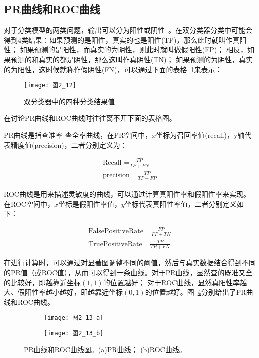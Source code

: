 \subsection{PR曲线和ROC曲线}
\label{2_5_1}

对于分类模型的两类问题，输出可以分为阳性或阴性~\cite{Powers2007Evaluation}。在双分类器分类中可能会得到$4$类结果：如果预测的是阳性，真实的也是阳性(TP)，那么此时就叫作真阳性； 如果预测的是阳性，而真实的为阴性，则此时就叫做假阳性(FP)； 相反，如果预测的和真实的都是阴性，那么这叫作真阴性(TN)； 如果预测的为阴性，真实的为阳性，这时候就称作假阴性(FN)，可以通过下面的表格~\ref{图2_12}来表示：
\begin{figure}[h] %
  \centering
  \texttt{[image: 图2\_12]}
  \caption{双分类器中的四种分类结果值}
  \label{图2_12}
\end{figure}
在讨论PR曲线和ROC曲线时往往离不开下面的表格图。

PR曲线是指查准率-查全率曲线，在PR空间中，$x$坐标为召回率值(recall)，y轴代表精度值(precision)，二者分别定义为：
\begin{linenomath}
\begin{align}
\textrm{Recall =$\frac{TP}{TP+FN}$}\label{式2_38}\\
\textrm{precision =$\frac{TP}{TP+FP}$}\label{式2_39}
\end{align}
\end{linenomath}

ROC曲线是用来描述灵敏度的曲线，可以通过计算真阳性率和假阳性率来实现。在ROC空间中，$x$坐标是假阳性率值，$y$坐标代表真阳性率值，二者分别定义如下：
\begin{linenomath}
\begin{align}
\textrm{FalsePositiveRate =$\frac{FP}{FP+TN}$}\label{式2_40}\\
\textrm{TruePositiveRate =$\frac{TP}{TP+FN}$}\label{式2_41}
\end{align}
\end{linenomath}

在进行计算时，可以通过对显著图调整不同的阈值，然后与真实数据结合得到不同的PR值（或ROC值），从而可以得到一条曲线。对于PR曲线，显然查的既准又全的比较好，即越靠近坐标$(1,1)$的位置越好； 对于ROC曲线，显然真阳性率越大、假阳性率越小越好，即越靠近坐标$(0,1)$的位置越好。图~\ref{图2_13}分别给出了PR曲线和ROC曲线。
\begin{figure}[h]
  \centering%
  \begin{subfigure}{0.4\textwidth}
    \texttt{[image: 图2\_13\_a]}
    \caption{}
    \label{图2_13_a}
  \end{subfigure}
  \hspace{4em}%
  \begin{subfigure}{0.4\textwidth}
    \texttt{[image: 图2\_13\_b]}
    \caption{}
    \label{图2_13_b}
  \end{subfigure}
  \caption{PR曲线和ROC曲线图。(a)PR曲线； (b)ROC曲线。}
  \label{图2_13}
\end{figure}

